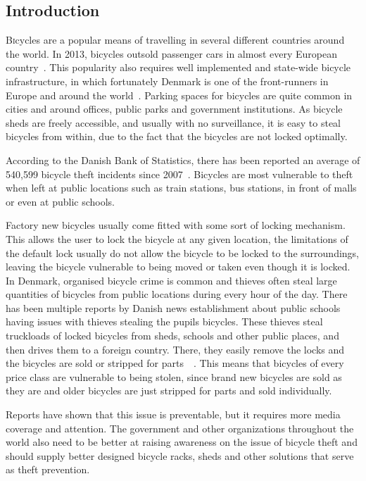 \documentclass[twoside]{article}
\begin{document}
\begin{multicols}{2} %

\section{Introduction}

\lettrine[nindent=0em,lines=3]{B}icycles are a popular means of travelling in several different countries around the world. In 2013, bicycles outsold passenger cars in almost every European country~\cite{outselling}. This popularity also requires well implemented and state-wide bicycle infrastructure, in which fortunately Denmark is one of the front-runners in Europe and around the world~\cite{impressive}. Parking spaces for bicycles are quite common in cities and around offices, public parks and government institutions. As bicycle sheds are freely accessible, and usually with no surveillance, it is easy to steal bicycles from within, due to the fact that the bicycles are not locked optimally.

According to the Danish Bank of Statistics, there has been reported an average of 540,599 bicycle theft incidents since 2007~\cite{bikestats}. Bicycles are most vulnerable to theft when left at public locations such as train stations, bus stations, in front of malls or even at public schools.


Factory new bicycles usually come fitted with some sort of locking mechanism. This allows the user to lock the bicycle at any given location, the limitations of the default lock usually do not allow the bicycle to be locked to the surroundings, leaving the bicycle vulnerable to being moved or taken even though it is locked. In Denmark, organised bicycle crime is common and thieves often steal large quantities of bicycles from public locations during every hour of the day. There has been multiple reports by Danish news establishment about public schools having issues with thieves stealing the pupils bicycles. These thieves steal truckloads of locked bicycles from sheds, schools and other public places, and then drives them to a foreign country. There, they easily remove the locks and the bicycles are sold or stripped for parts~\cite{herhuggerde}~\cite{vorescykler}. This means that bicycles of every price class are vulnerable to being stolen, since brand new bicycles are sold as they are and older bicycles are just stripped for parts and sold individually.


Reports have shown that this issue is preventable, but it requires more media coverage and attention. The government and other organizations throughout the world also need to be better at raising awareness on the issue of bicycle theft and should supply better designed bicycle racks, sheds and other solutions that serve as theft prevention. 


\end{multicols}
\end{document}
